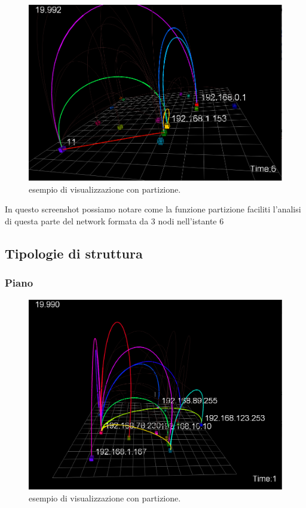 \documentclass[a4paper,12pt]{article}
\begin{document}
\begin{figure}[htb!]
 \begin{center}
  \includegraphics[width=\textwidth]{images/image3.png}
 \end{center}
 \caption{esempio di visualizzazione con  partizione.}
 \label{fig:slider}
\end{figure}
 
In questo screenshot possiamo notare come la funzione partizione faciliti l'analisi di questa parte del network formata da 3 nodi nell'istante 6 
 
\subsection{Tipologie di struttura}
 
\subsubsection{Piano}

\begin{figure}[htb!]
 \begin{center}
  \includegraphics[width=\textwidth]{images/image4.png}
 \end{center}
 \caption{esempio di visualizzazione con  partizione.}
 \label{fig:slider}
\end{figure}
\end{document}
